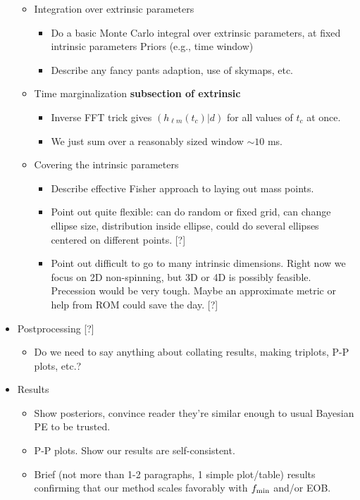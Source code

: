 \documentclass[twocolumn,prd,nofootinbib]{revtex4}
\begin{document}
\begin{widetext}
\begin{itemize}
\begin{itemize}
		
	\item Integration over extrinsic parameters
		\begin{itemize}
		\item Do a basic Monte Carlo integral over  extrinsic parameters, at fixed intrinsic parameters
                        Priors (e.g., time window)
		\item Describe any fancy pants adaption, use of skymaps, etc. 
		\end{itemize}
	\item Time marginalization  \textbf{subsection of extrinsic} 
		\begin{itemize}
		\item Inverse FFT trick gives $(h_{\ell m}(t_c) | d)$ for all values of $t_c$ at once.
		\item We just sum over a reasonably sized window $\sim 10$ ms. 
		\end{itemize}

	\item Covering the intrinsic parameters
		\begin{itemize}
		\item Describe effective Fisher approach to laying out mass points.
		\item Point out quite flexible: can do random or fixed grid, can change ellipse size, distribution inside ellipse,
			could do several ellipses centered on different points. [?]
		\item Point out difficult to go to many intrinsic dimensions. Right now we focus on 2D non-spinning, 
			but 3D or 4D is possibly feasible.
			Precession would be very tough. 
			Maybe an approximate metric or help from ROM could save the day. [?]
		\end{itemize}
		
	\end{itemize}
	
	\item Postprocessing [?]
		\begin{itemize}
		\item Do we need to say anything about collating results, making triplots, P-P plots, etc.?
		\end{itemize}

\item Results
	\begin{itemize}
	\item Show posteriors, convince reader they're similar enough to usual Bayesian PE to be trusted.
	\item P-P plots. Show our results are self-consistent.
	\item Brief (not more than 1-2 paragraphs, 1 simple plot/table) results confirming 
		that our method scales favorably with $f_{\rm min}$ and/or EOB. 
	\end{itemize}


\end{itemize}
\end{widetext}
\end{document}
